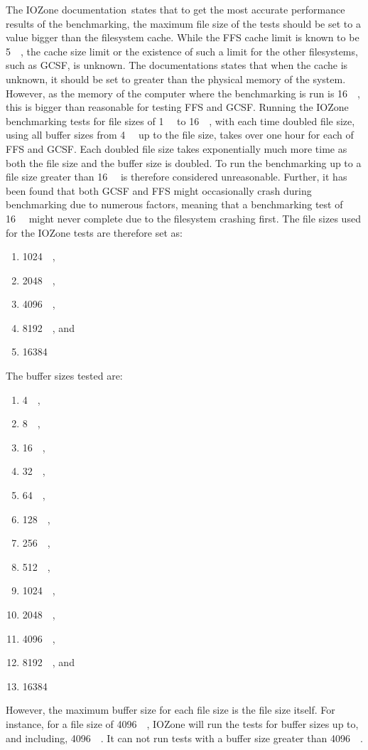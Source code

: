 \begin{enumerate}
The IOZone documentation\,\cite{iozoneIozoneFilesystemBenchmark} states that to get the most accurate performance results of the benchmarking, the maximum file size of the tests should be set to a value bigger than the filesystem cache. While the FFS cache limit is known to be \SI{5}{\mega\byte}, the cache size limit or the existence of such a limit for the other filesystems, such as GCSF, is unknown. The documentations states that when the cache is unknown, it should be set to greater than the physical memory of the system. However, as the memory of the computer where the benchmarking is run is \SI{16}{\giga\byte}, this is bigger than reasonable for testing FFS and GCSF. Running the IOZone benchmarking tests for file sizes of \SI{1}{\mega\byte} to \SI{16}{\mega\byte}, with each time doubled file size, using all buffer sizes from \SI{4}{\kilo\byte} up to the file size, takes over one hour for each of FFS and GCSF. Each doubled file size takes exponentially much more time as both the file size and the buffer size is doubled. To run the benchmarking up to a file size greater than \SI{16}{\giga\byte} is therefore considered unreasonable. Further, it has been found that both GCSF and FFS might occasionally crash during benchmarking due to numerous factors, meaning that a benchmarking test of \SI{16}{\giga\byte} might never complete due to the filesystem crashing first. The file sizes used for the IOZone tests are therefore set as:
\begin{enumerate}
	\item \SI{1024}{\kilo\byte},
	\item \SI{2048}{\kilo\byte},
	\item \SI{4096}{\kilo\byte},
	\item \SI{8192}{\kilo\byte}, and
	\item \SI{16384}{\kilo\byte}
\end{enumerate}
The buffer sizes tested are:
\begin{enumerate}
	\item \SI{4}{\kilo\byte},
	\item \SI{8}{\kilo\byte},
	\item \SI{16}{\kilo\byte},
	\item \SI{32}{\kilo\byte},
	\item \SI{64}{\kilo\byte},
	\item \SI{128}{\kilo\byte},
	\item \SI{256}{\kilo\byte},
	\item \SI{512}{\kilo\byte},
	\item \SI{1024}{\kilo\byte},
	\item \SI{2048}{\kilo\byte},
	\item \SI{4096}{\kilo\byte},
	\item \SI{8192}{\kilo\byte}, and
	\item \SI{16384}{\kilo\byte}
\end{enumerate}
However, the maximum buffer size for each file size is the file size itself. For instance, for a file size of \SI{4096}{\kilo\byte}, IOZone will run the tests for buffer sizes up to, and including, \SI{4096}{\kilo\byte}. It can not run tests with a buffer size greater than \SI{4096}{\kilo\byte}.


\end{enumerate}
